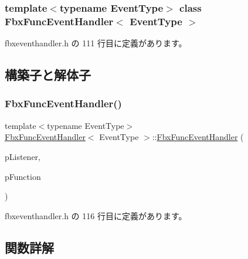 \subsubsection*{template$<$typename Event\+Type$>$\newline
class Fbx\+Func\+Event\+Handler$<$ Event\+Type $>$}



 fbxeventhandler.\+h の 111 行目に定義があります。



\subsection{構築子と解体子}
\mbox{\label{class_fbx_func_event_handler_adc9cefc0f250faf562bc0d8a83171548}} 
\subsubsection{\texorpdfstring{Fbx\+Func\+Event\+Handler()}{FbxFuncEventHandler()}}
{\footnotesize\ttfamily template$<$typename Event\+Type$>$ \\
\hyperlink{class_fbx_func_event_handler}{Fbx\+Func\+Event\+Handler}$<$ Event\+Type $>$\+::\hyperlink{class_fbx_func_event_handler}{Fbx\+Func\+Event\+Handler} (\begin{DoxyParamCaption}\item[{\hyperlink{class_fbx_listener}{Fbx\+Listener} $\ast$}]{p\+Listener,  }\item[{Callback\+Fnc}]{p\+Function }\end{DoxyParamCaption})\hspace{0.3cm}{\ttfamily [inline]}}



 fbxeventhandler.\+h の 116 行目に定義があります。



\subsection{関数詳解}
\mbox{\label{class_fbx_func_event_handler_a6111e1a7e1a0e60170a2de498fe44766}} 
